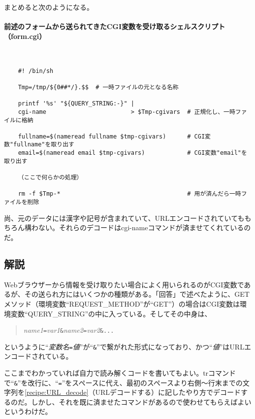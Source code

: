 まとめると次のようになる。
\paragraph{前述のフォームから送られてきたCGI変数を受け取るシェルスクリプト（form.cgi）} 　\\
\begin{frameboxit}{160.0mm}
\begin{verbatim}
	#! /bin/sh
	
	Tmp=/tmp/${0##*/}.$$  # 一時ファイルの元となる名称
	
	printf '%s' "${QUERY_STRING:-}" |
	cgi-name                        > $Tmp-cgivars  # 正規化し、一時ファイルに格納
	
	fullname=$(nameread fullname $tmp-cgivars)      # CGI変数"fullname"を取り出す
	email=$(nameread email $tmp-cgivars)            # CGI変数"email"を取り出す
	
	（ここで何らかの処理）
	
	rm -f $Tmp-*                                    # 用が済んだら一時ファイルを削除
\end{verbatim}
\end{frameboxit}

尚、元のデータには漢字や記号が含まれていて、URLエンコードされていてももちろん構わない。それらのデコードはcgi-nameコマンドが済ませてくれているのだ。

\subsection*{解説}
Webブラウザーから情報を受け取りたい場合によく用いられるのがCGI変数であるが、その送られ方にはいくつかの種類がある。「回答」で述べたように、GETメソッド（環境変数``REQUEST\_{}METHOD''が``GET''）の場合はCGI変数は環境変数``QUERY\_{}STRING''の中に入っている。そしてその中身は、
\begin{quote}
	\textit{name1}\verb|=|\textit{var1}\verb|&|\textit{name2}\verb|=|\textit{var2}\verb|&...|
\end{quote}
というように``\textit{変数名}\verb|=|\textit{値}''が``\verb|&|''で繋がれた形式になっており、かつ``\textit{値}''はURLエンコードされている。

ここまでわかっていれば自力で読み解くコードを書いてもよい。trコマンドで``\verb|&|''を改行に、``\verb|=|''をスペースに代え、最初のスペースより右側～行末までの文字列を\ref{recipe:URL_decode}（URLデコードする）に記したやり方でデコードするのだ。しかし、それを既に済ませたコマンドがあるので使わせてもらえばよいというわけだ。


